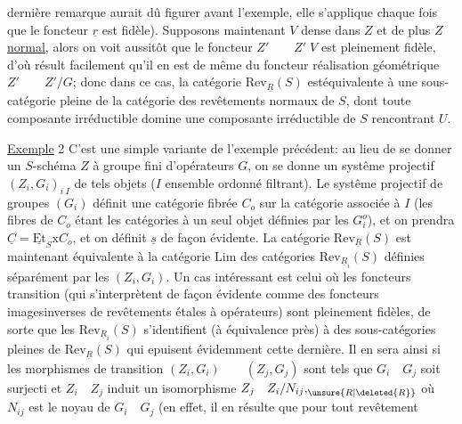 dernière remarque aurait dû figurer avant l'exemple, elle s'applique chaque fois que le foncteur $\underline{r}$ est fidèle).  Supposons maintenant $V$ dense dans $Z$ et de plus $Z$ \uline{normal}, alors on voit aussitôt que le foncteur $Z'\qquad Z'\;V$ est pleinement fidèle, d'où résult facilement qu'il en est de même du foncteur réalisation géométrique $Z'\qquad Z'/G$; donc dans ce cas, la catégorie $\mathrm{Rev}_{\underline{R}}(S)$  estéquivalente à une sous-catégorie pleine de la catégorie des revêtements  normaux de $S$, dont toute composante  irréductible domine une composante irréductible de $S$ rencontrant $U$.

\uline{Exemple} 2 C'est une simple variante de l'exemple précédent: au lieu de se donner un $S$-schéma $Z$ à groupe fini d'opérateurs $G$, on se donne un systême projectif $(Z_i,G_i)_{i\;I}$ de tels objets ($I$ ensemble ordonné filtrant).  Le systême projectif de groupes $(G_i)$ définit une catégorie fibrée $C_o$ sur la catégorie associée à $I$ (les fibres de $C_o$ étant les catégories à un seul objet définies par les $G_i^o$), et on prendra $\underline{C}=\underline{\mathrm{Et}}_S\mathrm{x}C_o$, et on définit $\underline{s}$ de façon évidente. La catégorie $\mathrm{Rev}_{\underline{R}}(S)$ est maintenant équivalente à la catégorie $\mathrm{Lim}$ des catégories $\mathrm{Rev}_{\underline{R}_i}(S)$ définies séparément par les $(Z_i,G_i)$. Un cas intéressant est celui où les foncteurs transition (qui s'interprètent de façon évidente comme des foncteurs imagesinverses de revêtements étales à opérateurs) sont pleinement fidèles, de sorte que les $\mathrm{Rev}_{\underline{R}_i}(S)$ s'identifient (à équivalence près) à des sous-catégories pleines de $\mathrm{Rev}_{\underline{R}}(S)$ qui epuisent évidemment cette dernière. Il en sera ainsi si les morphismes de transition $(Z_i,G_i)\qquad(Z_j,G_j)$ sont tels que $G_i\quad G_j$ soit surjecti et $Z_i\quad Z_j$ induit un isomorphisme $Z_j\quad Z_i/N_{ij}\mathord{,}_{\unsure{R|\deleted{R}}}$ où $N_{ij}$ est le noyau de $G_i\quad G_j$ (en effet, il en résulte que pour tout revêtement 

